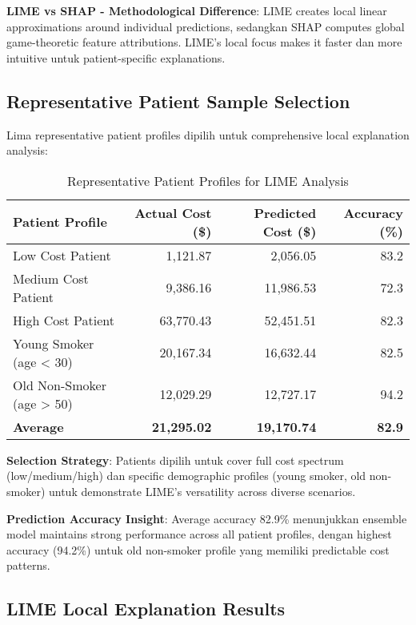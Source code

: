 \textbf{LIME vs SHAP - Methodological Difference}: LIME creates local linear approximations around individual predictions, sedangkan SHAP computes global game-theoretic feature attributions. LIME's local focus makes it faster dan more intuitive untuk patient-specific explanations.

\subsection{Representative Patient Sample Selection}
\label{subsec:lime-patient-selection}

Lima representative patient profiles dipilih untuk comprehensive local explanation analysis:

\begin{table}[H]
\centering
\caption{Representative Patient Profiles for LIME Analysis}
\label{tab:lime-patient-profiles}
\begin{tabular}{|l|r|r|r|}
\hline
\textbf{Patient Profile} & \textbf{Actual Cost (\$)} & \textbf{Predicted Cost (\$)} & \textbf{Accuracy (\%)} \\
\hline
Low Cost Patient & 1,121.87 & 2,056.05 & 83.2 \\
Medium Cost Patient & 9,386.16 & 11,986.53 & 72.3 \\
High Cost Patient & 63,770.43 & 52,451.51 & 82.3 \\
Young Smoker (age < 30) & 20,167.34 & 16,632.44 & 82.5 \\
Old Non-Smoker (age > 50) & 12,029.29 & 12,727.17 & 94.2 \\
\hline
\textbf{Average} & \textbf{21,295.02} & \textbf{19,170.74} & \textbf{82.9} \\
\hline
\end{tabular}
\end{table}

\textbf{Selection Strategy}: Patients dipilih untuk cover full cost spectrum (low/medium/high) dan specific demographic profiles (young smoker, old non-smoker) untuk demonstrate LIME's versatility across diverse scenarios.

\textbf{Prediction Accuracy Insight}: Average accuracy 82.9\% menunjukkan ensemble model maintains strong performance across all patient profiles, dengan highest accuracy (94.2\%) untuk old non-smoker profile yang memiliki predictable cost patterns.

\subsection{LIME Local Explanation Results}
\label{subsec:lime-results}

